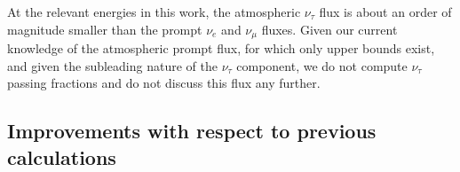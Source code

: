 \documentclass[aps,prd,showpacs,letterpaper,onecolumn,longbibliography,superscriptaddress,notitlepage,nofootinbib]{revtex4-1}%
\begin{document}
At the relevant energies in this work, the atmospheric $\nu_\tau$ flux is about an order of magnitude smaller than the prompt $\nu_e$ and $\nu_\mu$ fluxes. Given our current knowledge of the atmospheric prompt flux, for which only upper bounds exist, and given the subleading nature of the $\nu_\tau$ component, we do not compute $\nu_\tau$ passing fractions and do not discuss this flux any further. 

\subsection{Improvements with respect to previous calculations}
\label{sec:improvements}

\begin{figure}
\centering
     \\[2ex]
\end{figure}
\end{document}
